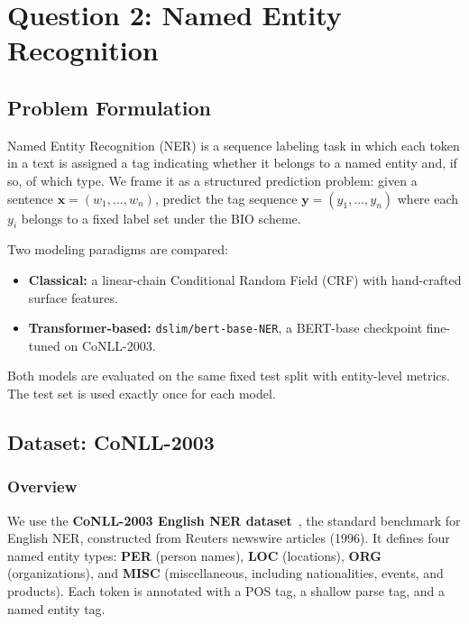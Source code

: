 \documentclass[11pt,a4paper]{article}
\begin{document}
\section{Question 2: Named Entity Recognition}
\label{sec:q2}

\subsection{Problem Formulation}

Named Entity Recognition (NER) is a sequence labeling task in which each token
in a text is assigned a tag indicating whether it belongs to a named entity and,
if so, of which type. We frame it as a structured prediction problem: given a
sentence $\mathbf{x} = (w_1, \ldots, w_n)$, predict the tag sequence
$\mathbf{y} = (y_1, \ldots, y_n)$ where each $y_i$ belongs to a fixed label
set under the BIO scheme.

Two modeling paradigms are compared:
\begin{itemize}[noitemsep]
    \item \textbf{Classical:} a linear-chain Conditional Random Field (CRF)
    with hand-crafted surface features.
    \item \textbf{Transformer-based:} \texttt{dslim/bert-base-NER}, a BERT-base
    checkpoint fine-tuned on CoNLL-2003.
\end{itemize}
Both models are evaluated on the same fixed test split with entity-level
metrics. The test set is used exactly once for each model.

\subsection{Dataset: CoNLL-2003}

\subsubsection{Overview}

We use the \textbf{CoNLL-2003 English NER dataset}~\cite{tjong2003}, the
standard benchmark for English NER, constructed from Reuters newswire articles
(1996). It defines four named entity types: \textbf{PER} (person names),
\textbf{LOC} (locations), \textbf{ORG} (organizations), and \textbf{MISC}
(miscellaneous, including nationalities, events, and products). Each token is
annotated with a POS tag, a shallow parse tag, and a named entity tag.
\end{document}
